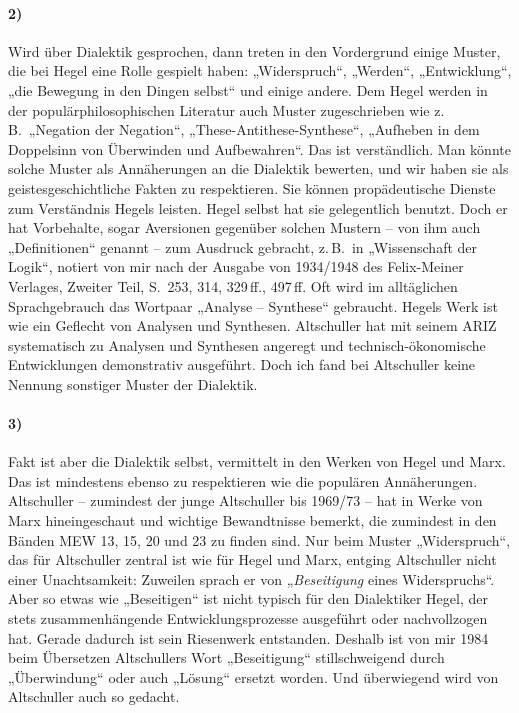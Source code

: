 \documentclass[12pt,a4paper]{article}
\begin{document}
\paragraph{2)} 
Wird über Dialektik gesprochen, dann treten in den Vordergrund einige Muster,
die bei Hegel eine Rolle gespielt haben: „Widerspruch“, „Werden“,
„Entwicklung“, „die Bewegung in den Dingen selbst“ und einige andere. Dem Hegel
werden in der populärphilosophischen Literatur auch Muster zugeschrieben wie
z.\,B.\ „Negation der Negation“, „These-Antithese-Synthese“, „Aufheben in dem
Doppelsinn von Überwinden und Aufbewahren“. Das ist verständlich. Man könnte
solche Muster als Annäherungen an die Dialektik bewerten, und wir haben sie als
geistesgeschichtliche Fakten zu respektieren. Sie können propädeutische Dienste
zum Verständnis Hegels leisten. Hegel selbst hat sie gelegentlich benutzt. Doch
er hat Vorbehalte, sogar Aversionen gegenüber solchen Mustern – von ihm auch
„Definitionen“ genannt – zum Ausdruck gebracht, z.\,B.\ in „Wissenschaft der
Logik“, notiert von mir nach der Ausgabe von 1934/1948 des Felix-Meiner
Verlages, Zweiter Teil, S.~253, 314, 329\,ff., 497\,ff.  Oft wird im
alltäglichen Sprachgebrauch das Wortpaar „Analyse – Synthese“ gebraucht. Hegels
Werk ist wie ein Geflecht von Analysen und Synthesen. Altschuller hat mit
seinem ARIZ systematisch zu Analysen und Synthesen angeregt und
technisch-ökonomische Entwicklungen demonstrativ ausgeführt. Doch ich fand bei
Altschuller keine Nennung sonstiger Muster der Dialektik.

\paragraph{3)} 
Fakt ist aber die Dialektik selbst, vermittelt in den Werken von Hegel und
Marx. Das ist mindestens ebenso zu respektieren wie die populären Annäherungen.
Altschuller – zumindest der junge Altschuller bis 1969/73 – hat in Werke von
Marx hineingeschaut und wichtige Bewandtnisse bemerkt, die zumindest in den
Bänden MEW 13, 15, 20 und 23 zu finden sind. Nur beim Muster „Widerspruch“, das
für Altschuller zentral ist wie für Hegel und Marx, entging Altschuller nicht
einer Unachtsamkeit: Zuweilen sprach er von „\emph{Beseitigung} eines
Widerspruchs“.  Aber so etwas wie „Beseitigen“ ist nicht typisch für den
Dialektiker Hegel, der stets zusammenhängende Entwicklungsprozesse ausgeführt
oder nachvollzogen hat.  Gerade dadurch ist sein Riesenwerk entstanden. Deshalb
ist von mir 1984 beim Übersetzen Altschullers Wort „Beseitigung“
stillschweigend durch „Überwindung“ oder auch „Lösung“ ersetzt worden. Und
überwiegend wird von Altschuller auch so gedacht.
\end{document}
